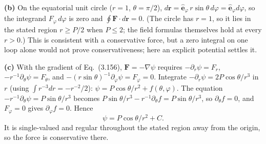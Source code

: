 \textbf{(b)} On the equatorial unit circle ($r=1$, $\theta=\pi/2$),
$d\mathbf r=\hat{\mathbf e}_\varphi\,r\sin\theta\,d\varphi
=\hat{\mathbf e}_\varphi d\varphi$,
so the integrand $F_\varphi\,d\varphi$ is zero and
$\boxed{\oint\mathbf F\cdot d\mathbf r=0}$.
(The circle has $r=1$, so it lies in the stated region $r\ge P/2$
when $P\le2$; the field formulas themselves hold at every $r>0$.)
This is consistent with a conservative force, but a zero integral on
one loop alone would not prove conservativeness;
here an explicit potential settles it.

\textbf{(c)} With the gradient of Eq.~(3.156), $\mathbf F=-\nabla\psi$
requires $-\partial_r\psi=F_r$, $-r^{-1}\partial_\theta\psi=F_\theta$,
and $-(r\sin\theta)^{-1}\partial_\varphi\psi=F_\varphi=0$.
Integrate $-\partial_r\psi=2P\cos\theta/r^3$ in $r$
(using $\int r^{-3}dr=-r^{-2}/2$):
$\psi=P\cos\theta/r^2+f(\theta,\varphi)$.
The equation $-r^{-1}\partial_\theta\psi=P\sin\theta/r^3$
becomes $P\sin\theta/r^3-r^{-1}\partial_\theta f=P\sin\theta/r^3$, so
$\partial_\theta f=0$, and $F_\varphi=0$ gives
$\partial_\varphi f=0$. Hence
\[
\boxed{\psi=P\cos\theta/r^2+C}.
\]
It is single-valued and regular throughout the stated region away
from the origin, so the force is conservative there.

